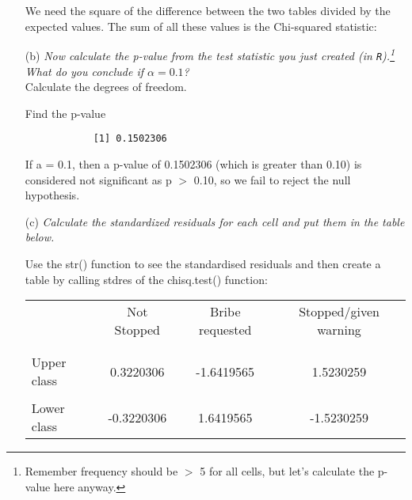 \documentclass[12pt,letterpaper]{article}
\begin{document}
\begin{enumerate}
		\noindent We need the square of the difference between the two tables divided by the expected values. The sum of all these values is the Chi-squared statistic:
		
		\vspace{.5cm}
		
		
		\item [(b)]
		\emph{Now calculate the p-value from the test statistic you just created (in \texttt{R}).\footnote{Remember frequency should be $>$ 5 for all cells, but let's calculate the p-value here anyway.}  What do you conclude if $\alpha = 0.1$?}\\
		
		\noindent Calculate the degrees of freedom.
		
		
		\noindent Find the p-value
		
		
		\begin{verbatim}
			[1] 0.1502306
		\end{verbatim}
		
		\noindent If a = 0.1, then a p-value of 0.1502306 (which is greater than 0.10) is considered not significant as p $>$ 0.10, so we fail to reject the null hypothesis.
		
		\item [(c)] \emph{Calculate the standardized residuals for each cell and put them in the table below.}
		\vspace{.5cm}
		
		\noindent Use the str() function to see the standardised residuals and then create a table by calling stdres of the chisq.test() function:
		
		
		\newpage
		
		\begin{table}[h]
			\centering
			\begin{tabular}{l | c c c }
				& Not Stopped & Bribe requested & Stopped/given warning \\
				\\[-1.8ex] 
				\hline \\[-1.8ex]
				Upper class   &  0.3220306 & -1.6419565  &1.5230259  \\
				\\
				Lower class & -0.3220306 & 1.6419565  & -1.5230259  \\
				

\end{tabular}
\end{table}
\end{enumerate}
\end{document}
